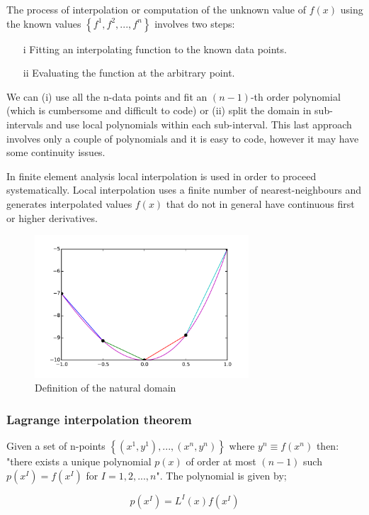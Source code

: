 The process of interpolation or computation of the unknown value of $f(x)$ using the known values $\left\{ {{f^1},{f^2},...,{f^n}} \right\}$ involves two steps:

\begin{itemize}
\item[i]  Fitting an interpolating function to the known data points.
\item[ii] Evaluating the function at the arbitrary point.
\end{itemize}

We can (i) use all the n-data points and fit an $(n-1)$-th order polynomial (which is cumbersome and difficult to code) or (ii) split the domain in sub-intervals and use local polynomials within each sub-interval. This last approach involves only a couple of polynomials and it is easy to code, however it may have some continuity issues.

In finite element analysis local interpolation is used in order to proceed systematically. Local interpolation uses a finite number of nearest-neighbours and generates interpolated values $f(x)$ that do not in general have continuous first or higher derivatives.

\begin{figure}[h]
\centering
\includegraphics[width=8cm]{img/interpol2.pdf}
\caption{Definition of the natural domain}
\label{fig:interpol2}
\end{figure}

\subsubsection{Lagrange interpolation theorem}
Given a set of n-points $\left\{ {({x^1},{y^1}),...,({x^n},{y^n})} \right\}$ where ${y^n} \equiv f({x^n})$ then: "there exists a unique polynomial $p(x)$ of order at most $(n-1)$ such $p({x^I}) = f({x^I})$ for $I=1,2,...,n$". The polynomial is given by;

\begin{equation}
p({x^I}) = {L^I}(x)f({x^I})
\label{pol}
\end{equation}

